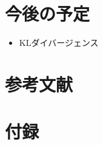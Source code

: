 \documentclass[report]{jlreq}
\begin{document}
%
%
%

%
\section*{今後の予定}

\begin{itemize}
    \item KLダイバージェンス
\end{itemize}

%
\section*{参考文献}

\nocite{amari_information_2016}

{
    \renewcommand{\bibsection}{}
    
    
}

%
\newpage
\appendix
\renewcommand\thesection{\Alph{section}}
\setcounter{section}{0}
\section{付録}
\end{document}
